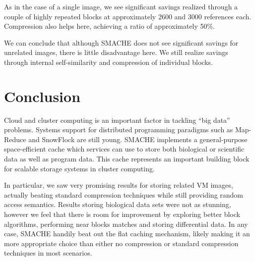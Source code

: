 \documentclass{sigplanconf}[11pt]
\begin{document}
As in the case of a single image, we see significant savings realized through a
couple of highly repeated blocks at approximately 2600 and 3000 references
each.  Compression also helps here, achieving a ratio of approximately 50\%.

We can conclude that although SMACHE does not see significant savings for
unrelated images, there is little disadvantage here.  We still realize savings
through internal self-similarity and compression of individual blocks.

\section{Conclusion}
\label{sec:conclusion}

Cloud and cluster computing is an important factor in tackling ``big data''
problems.  Systems support for distributed programming paradigms such as
Map-Reduce and SnowFlock are still young.  SMACHE implements a general-purpose
space-efficient cache which services can use to store both biological or
scientific data as well as program data.  This cache represents an important
building block for scalable storage systems in cluster computing.

In particular, we saw very promising results for storing related VM images,
actually beating standard compression techniques while still providing random
access semantics.  Results storing biological data sets were not as stunning,
however we feel that there is room for improvement by exploring better block
algorithms, performing near blocks matches and storing differential data.  In
any case, SMACHE handily beat out the flat caching mechanism, likely making it
an more appropriate choice than either no compression or standard compression
techniques in most scenarios.



\end{document}
